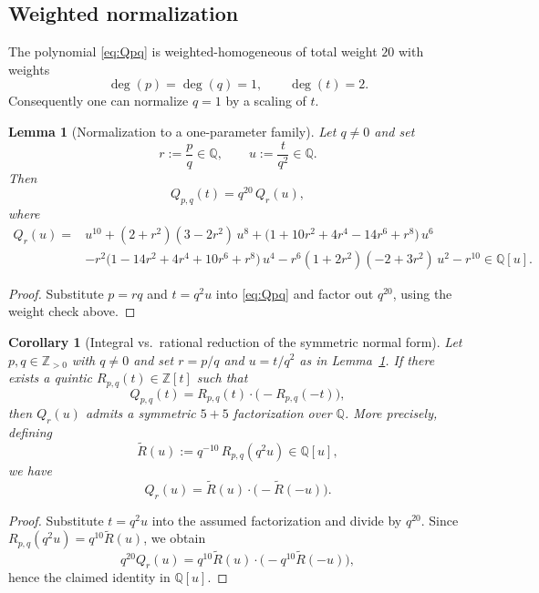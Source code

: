 \documentclass[12pt]{article}
\newtheorem{lemma}{Lemma}
\newtheorem{corollary}{Corollary}
\theoremstyle{remark}
\theoremstyle{definition}
\begin{document}
\subsection{Weighted normalization}
The polynomial \eqref{eq:Qpq} is weighted-homogeneous of total weight $20$ with weights
\[
\deg(p)=\deg(q)=1,\qquad \deg(t)=2.
\]
Consequently one can normalize $q=1$ by a scaling of $t$.

\begin{lemma}[Normalization to a one-parameter family]\label{lem:normalize}
Let $q\neq 0$ and set
\[
r:=\frac{p}{q}\in\mathbb{Q},\qquad u:=\frac{t}{q^{2}}\in\mathbb{Q}.
\]
Then
\begin{equation}\label{eq:normalize}
Q_{p,q}(t)=q^{20}\,Q_r(u),
\end{equation}
where
\begin{equation}\label{eq:Qr}
\begin{aligned}
Q_r(u)
={}& u^{10} + (2+r^2)(3-2r^2)\,u^{8} + \bigl(1+10r^2+4r^4-14r^6+r^8\bigr)\,u^{6}\\
& - r^2\bigl(1-14r^2+4r^4+10r^6+r^8\bigr)\,u^{4}
 - r^6(1+2r^2)(-2+3r^2)\,u^{2}
 - r^{10}\in\mathbb{Q}[u].
\end{aligned}
\end{equation}
\end{lemma}

\begin{proof}
Substitute $p=rq$ and $t=q^2 u$ into \eqref{eq:Qpq} and factor out $q^{20}$, using the weight check above.
\end{proof}

\begin{corollary}[Integral vs.\ rational reduction of the symmetric normal form]\label{cor:int_to_rat}
Let $p,q\in\mathbb{Z}_{>0}$ with $q\neq 0$ and set $r=p/q$ and $u=t/q^2$ as in Lemma~\ref{lem:normalize}.
If there exists a quintic $R_{p,q}(t)\in\mathbb{Z}[t]$ such that
\[
Q_{p,q}(t)=R_{p,q}(t)\cdot\bigl(-R_{p,q}(-t)\bigr),
\]
then $Q_r(u)$ admits a symmetric $5+5$ factorization over $\mathbb{Q}$.
More precisely, defining
\[
\widetilde{R}(u):=q^{-10}\,R_{p,q}(q^{2}u)\in\mathbb{Q}[u],
\]
we have
\[
Q_r(u)=\widetilde{R}(u)\cdot\bigl(-\widetilde{R}(-u)\bigr).
\]
\end{corollary}

\begin{proof}
Substitute $t=q^2u$ into the assumed factorization and divide by $q^{20}$.
Since $R_{p,q}(q^2u)=q^{10}\widetilde{R}(u)$, we obtain
\[
q^{20}Q_r(u)=q^{10}\widetilde{R}(u)\cdot\bigl(-q^{10}\widetilde{R}(-u)\bigr),
\]
hence the claimed identity in $\mathbb{Q}[u]$.
\end{proof}
\end{document}
